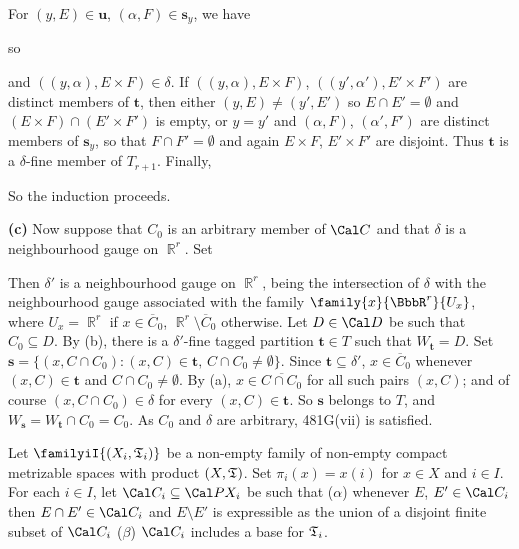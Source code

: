 {\noindent For $(y,E)\in\pmb{u}$, $(\alpha,F)\in\pmb{s}_y$, we have


\noindent so


\noindent and $((y,\alpha),E\times F)\in\delta$.
If $((y,\alpha),E\times F)$, $((y',\alpha'),E'\times F')$ are distinct
members of $\pmb{t}$, then either $(y,E)\ne(y',E')$ so
$E\cap E'=\emptyset$ and $(E\times F)\cap(E'\times F')$ is empty, or
$y=y'$ and $(\alpha,F)$, $(\alpha',F')$ are distinct members of
$\pmb{s}_y$, so that $F\cap F'=\emptyset$ and again $E\times F$,
$E'\times F'$ are disjoint.    Thus $\pmb{t}$ is a $\delta$-fine member
of $T_{r+1}$.   Finally,


\noindent So the induction proceeds.\ \Qed

\medskip

{\bf (c)} Now suppose that $C_0$ is an arbitrary member of $\Cal C$ and
that $\delta$ is a neighbourhood gauge on $\BbbR^r$.   Set


\noindent Then $\delta'$ is a neighbourhood gauge on $\BbbR^r$, being
the intersection of $\delta$ with the neighbourhood gauge associated
with the family $\family{x}{\BbbR^r}{U_x}$, where $U_x=\BbbR^r$ if
$x\in\overline{C}_0$, $\BbbR^r\setminus\overline{C}_0$ otherwise.   Let
$D\in\Cal D$ be such that $C_0\subseteq D$.   By (b), there is a
$\delta'$-fine tagged partition $\pmb{t}\in T$ such that
$W_{\pmb{t}}=D$.   Set
$\pmb{s}=\{(x,C\cap C_0):(x,C)\in\pmb{t},\,C\cap C_0\ne\emptyset\}$.
Since $\pmb{t}\subseteq\delta'$, $x\in\overline{C}_0$ whenever
$(x,C)\in\pmb{t}$ and
$C\cap C_0\ne\emptyset$.   By (a), $x\in\overline{C\cap C_0}$ for all
such pairs $(x,C)$;  and of course $(x,C\cap C_0)\in\delta$ for every
$(x,C)\in\pmb{t}$.   So $\pmb{s}$ belongs to $T$, and
$W_{\pmb{s}}=W_{\pmb{t}}\cap C_0=C_0$.   As $C_0$ and $\delta$ are
arbitrary, 481G(vii) is satisfied.
}%

 Let $\familyiI{(X_i,\frak T_i)}$ be a non-empty family of non-empty
compact metrizable spaces with product $(X,\frak T)$.   Set
$\pi_i(x)=x(i)$ for $x\in X$ and $i\in I$.   For each $i\in I$, let
$\Cal C_i\subseteq\Cal PX_i$ be such that ($\alpha$) whenever $E$,
$E'\in\Cal C_i$ then
$E\cap E'\in\Cal C_i$ and $E\setminus E'$ is expressible as the union of
a disjoint finite subset of $\Cal C_i$ ($\beta$) $\Cal C_i$ includes a
base for $\frak T_i$.

